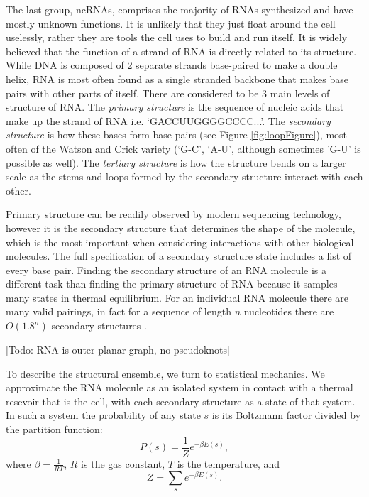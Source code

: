 The last group, ncRNAs, comprises the majority of RNAs synthesized and
have mostly unknown functions. It is unlikely that they just float
around the cell uselessly, rather they are tools the cell uses to
build and run itself. It is widely believed that the function of a
strand of RNA is directly related to its structure. While DNA is
composed of 2 separate strands base-paired to make a double helix, RNA
is most often found as a single stranded backbone that makes base
pairs with other parts of itself. There are considered to be 3 main
levels of structure of RNA. The \emph{primary structure} is the
sequence of nucleic acids that make up the strand of RNA
i.e. `GACCUUGGGGCCCC...'. The \emph{secondary structure} is how these
bases form base pairs (see Figure \ref{fig:loopFigure}), most often of
the Watson and Crick variety (`G-C', `A-U', although sometimes 'G-U'
is possible as well). The \emph{tertiary structure} is how the
structure bends on a larger scale as the stems and loops formed by the
secondary structure interact with each other.

Primary structure can be readily observed by modern sequencing
technology, however it is the secondary structure that determines the
shape of the molecule, which is the most important when considering
interactions with other biological molecules. The full specification
of a secondary structure state includes a list of every base
pair. Finding the secondary structure of an RNA molecule is a
different task than finding the primary structure of RNA because it
samples many states in thermal equilibrium. For an individual RNA
molecule there are many valid pairings, in fact for a sequence of
length $n$ nucleotides there are $O(1.8^n)$ secondary structures
\cite{hofacker1998combinatorics}.

[Todo: RNA is outer-planar graph, no pseudoknots]

To describe the structural ensemble, we turn to statistical
mechanics. We approximate the RNA molecule as an isolated system in
contact with a thermal resevoir that is the cell, with each secondary
structure as a state of that system. In such a system the probability
of any state $s$ is its Boltzmann factor divided by the partition
function:
\begin{equation}
P(s) = \frac{1}{Z} e^{-\beta E(s)},
\end{equation}
where $\beta = \frac{1}{RT}$, $R$ is the gas constant, $T$ is the
temperature, and
\begin{equation}
Z = \sum_{s} e^{-\beta E(s)}.
\end{equation}

